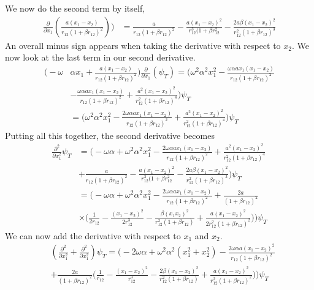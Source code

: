 \documentclass[11pt]{article}
\begin{document}
We now do the second term by itself,
\begin{align*}
	\frac{\partial}{\partial x_1}\left( \frac{a(x_1-x_2)}{r_{12}(1+\beta r_{12})^2} \right) \bigg) &= \frac{a}{r_{12}(1+\beta r_{12})^2} - \frac{a(x_1-x_2)^2}{r_{12}^3(1+\beta r_{12}^2} - \frac{2a\beta(x_1-x_2)^2}{r_{12}^2(1+\beta r_12)^3}
\end{align*}
An overall minus sign appears when taking the derivative with respect to $x_2$. We now look at the last term in our second derivative.
\begin{align*}
	\bigg(-\omega &\alpha x_1 + \frac{a(x_1-x_2)}{r_{12}(1+\beta r_{12})^2} \bigg) \frac{\partial}{\partial x_1}\left(\psi_T\right) = \bigg( \omega^2\alpha^2 x_1^2 - \frac{\omega\alpha a x_1(x_1-x_2)}{r_{12}(1+\beta r_{12})^2} \\
	& - \frac{\omega\alpha a x_1 (x_1 - x_2)}{r_{12}(1+\beta r_{12})^2} + \frac{a^2(x_1 - x_2)^2}{r_{12}^2(1+\beta r_{12})^4}\bigg) \psi_T \\
	&= \bigg( \omega^2\alpha^2 x_1^2 - \frac{2\omega\alpha a x_1(x_1-x_2)}{r_{12}(1+\beta r_{12})^2} + \frac{a^2(x_1 - x_2)^2}{r_{12}^2(1+\beta r_{12})^4}\bigg) \psi_T
\end{align*}
Putting all this together, the second derivative becomes
\begin{align*}
	\frac{\partial^2}{\partial x_1^2} \psi_T &= \bigg( - \omega \alpha + \omega^2\alpha^2 x_1^2 - \frac{2\omega\alpha a x_1(x_1-x_2)}{r_{12}(1+\beta r_{12})^2} + \frac{a^2(x_1 - x_2)^2}{r_{12}^2(1+\beta r_{12})^4} \\
	& + \frac{a}{r_{12}(1+\beta r_{12})^2} - \frac{a(x_1-x_2)^2}{r_{12}^3(1+\beta r_{12}^2} - \frac{2a\beta(x_1-x_2)^2}{r_{12}^2(1+\beta r_12)^3} \bigg) \psi_T \\
	&= \bigg( - \omega \alpha + \omega^2\alpha^2 x_1^2 - \frac{2\omega\alpha a x_1(x_1-x_2)}{r_{12}(1+\beta r_{12})^2} + \frac{2a}{(1+\beta r_{12})^2} 
	\\ &\times \bigg( \frac{1}{2r_{12}} - \frac{(x_1 - x_2)^2}{2 r_{12}^3} - \frac{\beta (x_1 x_2)^2}{r_{12}^2(1+\beta r_{12})} + \frac{a(x_1-x_2)^2}{2r_{12}^2(1+\beta r_{12})^2} \bigg) \bigg) \psi_T
\end{align*}
We can now add the derivative with respect to $x_1$ and $x_2$.
\begin{align*}
	&\left( \frac{\partial^2}{\partial x_1^2} + \frac{\partial^2}{\partial x_1^2} \right)\psi_T = \bigg( - 2\omega \alpha + \omega^2\alpha^2 \left(x_1^2 + x_2^2\right) - \frac{2\omega\alpha a (x_1 - x_2)^2}{r_{12}(1+\beta r_{12})^2} \\
	&+ \frac{2a}{(1+\beta r_{12})^2} \bigg( \frac{1}{r_{12}} - \frac{(x_1 - x_2)^2}{r_{12}^3} - \frac{2\beta (x_1 - x_2)^2}{r_{12}^2(1+\beta r_{12})} + \frac{a(x_1-x_2)^2}{r_{12}^2(1+\beta r_{12})^2} \bigg) \bigg) \psi_T
\end{align*}
\end{document}
